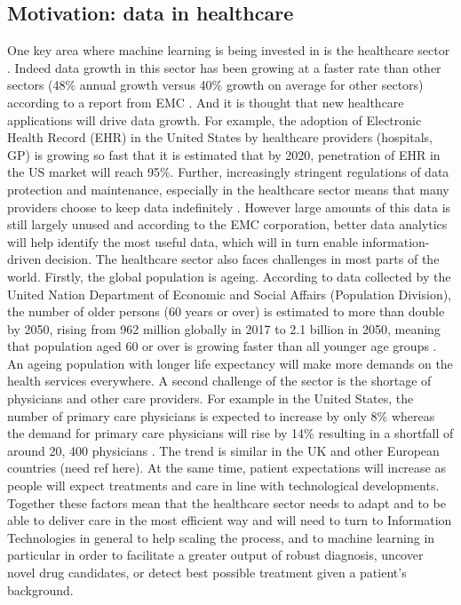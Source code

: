 \subsection{Motivation: data in healthcare}
One key area where machine learning is being invested in is the healthcare sector \citep{Obermeyer:2016ju,EMC:2014ve, Evans:sHGdqFvY}. Indeed data growth in this sector has been growing at a faster rate than other sectors (48\% annual growth versus 40\% growth on average for other sectors) according to a report from EMC \citep{EMC:2014ve}. And it is thought that new healthcare applications will drive data growth. For example, the adoption of Electronic Health Record (EHR) in the United States by healthcare providers (hospitals, GP) is growing so fast that it is estimated that by 2020, penetration of EHR in the US market will reach 95\%. Further, increasingly stringent regulations of data protection and maintenance, especially in the healthcare sector means that many providers choose to keep data indefinitely \citep{EMC:2014ve}.  However large amounts of this data is still largely unused and according to the EMC corporation, better data analytics will help identify the most useful data, which will in turn enable information-driven decision.
The healthcare sector also faces challenges in most parts of the world. Firstly, the global population is ageing. According to data collected by the United Nation Department of Economic and Social Affairs (Population Division), the number of older persons (60 years or over) is estimated to more than double by 2050, rising from 962 million globally in 2017 to 2.1 billion in 2050, meaning that population aged 60 or over is growing faster than all younger age groups \citep{UnitedNations:2017wd}. An ageing population with longer life expectancy will make more demands on the health services everywhere. A second challenge of the sector is the shortage of physicians and other care providers. For example in the United States, the number of primary care physicians is expected to increase by only 8\% whereas the demand for primary care physicians will rise by 14\% resulting in a shortfall of around 20, 400 physicians \citep{EMC:2014ve}. The trend is similar in the UK and other European countries (need ref here). At the same time, patient expectations will increase as people will expect treatments and care in line with technological developments.\newline
Together these factors  mean that the healthcare sector needs to adapt and to be able to deliver care in the most efficient way and will need to turn to Information Technologies in general to help scaling the process, and to machine learning in particular in order to facilitate a greater output of robust diagnosis, uncover novel drug candidates, or detect best possible treatment given a patient's background.\newline

